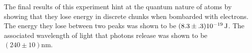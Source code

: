 \begin{paper}
The final results of this experiment hint at the quantum nature of atoms by showing that they lose energy in discrete chunks when bombarded with electrons.
The energy they lose between two peaks was shown to be $(8.3\pm.3)\SI{E-19}{\joule}$. The associated wavelength of light that photons release was shown to be $(240\pm10)\si{\nano\meter}$.
	


\end{paper}
